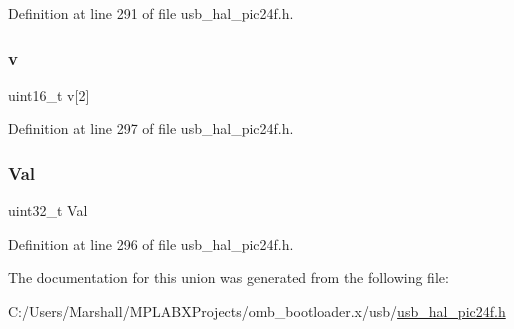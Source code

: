 Definition at line 291 of file usb\+\_\+hal\+\_\+pic24f.\+h.

\mbox{\label{union_____b_d_t_ad3333479e5f03245d832c5d7e29f313f}} 
\subsubsection{\texorpdfstring{v}{v}}
{\footnotesize\ttfamily uint16\+\_\+t v\mbox{[}2\mbox{]}}



Definition at line 297 of file usb\+\_\+hal\+\_\+pic24f.\+h.

\mbox{\label{union_____b_d_t_a4497b7ccdd35adfe3656ecc961faad01}} 
\subsubsection{\texorpdfstring{Val}{Val}}
{\footnotesize\ttfamily uint32\+\_\+t Val}



Definition at line 296 of file usb\+\_\+hal\+\_\+pic24f.\+h.



The documentation for this union was generated from the following file\+:\begin{DoxyCompactItemize}
\item 
C\+:/\+Users/\+Marshall/\+M\+P\+L\+A\+B\+X\+Projects/omb\+\_\+bootloader.\+x/usb/\mbox{\hyperlink{usb__hal__pic24f_8h}{usb\+\_\+hal\+\_\+pic24f.\+h}}\end{DoxyCompactItemize}
